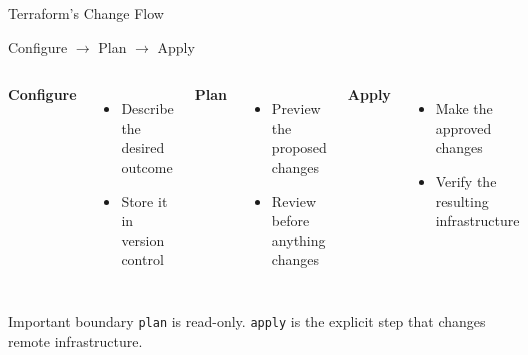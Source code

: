 \documentclass[aspectratio=169, xcolor=table]{beamer}
\begin{document}
\begin{frame}{Terraform's Change Flow}
  \begin{center}
    \Large \textcolor{PrimaryAccent}{Configure} $\longrightarrow$ \textcolor{SecondaryAccent}{Plan} $\longrightarrow$ \textcolor{AlertColor}{Apply}
  \end{center}

  \vspace{1em}
  \begin{columns}[T]
    \textbf{Configure}
    \begin{itemize}
      \item Describe the desired outcome
      \item Store it in version control
    \end{itemize}

    \textbf{Plan}
    \begin{itemize}
      \item Preview the proposed changes
      \item Review before anything changes
    \end{itemize}

    \textbf{Apply}
    \begin{itemize}
      \item Make the approved changes
      \item Verify the resulting infrastructure
    \end{itemize}
  \end{columns}

  \vspace{0.8em}
  \begin{alertblock}{Important boundary}
    \texttt{plan} is read-only. \texttt{apply} is the explicit step that changes remote infrastructure.
  \end{alertblock}
\end{frame}
\end{document}
